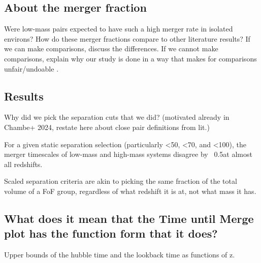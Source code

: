 \documentclass[twocolumn,linenumbers]{aastex631}
\begin{document}
\subsection{About the merger fraction}
Were low-mass pairs expected to have such a high merger rate in isolated environs? 
How do these merger fractions compare to other literature results? 
If we can make comparisons, discuss the differences. 
If we cannot make comparisons, explain why our study is done in a way that makes for comparisons unfair/undoable .

\subsection{Results}

Why did we pick the separation cuts that we did? (motivated already in Chambe+ 2024, restate here about close pair definitions from lit.)

For a given static separation selection (particularly <50, <70, and <100), the merger timescales of low-mass and high-mass systems disagree by ~0.5\Gyr at almost all redshifts.

Scaled separation criteria are akin to picking the same fraction of the total volume of a FoF group, regardless of what redshift it is at, not what mass it has. 


\subsection{What does it mean that the Time until Merge plot has the function form that it does?}
Upper bounds of the hubble time and the lookback time as functions of z.





\end{document}

